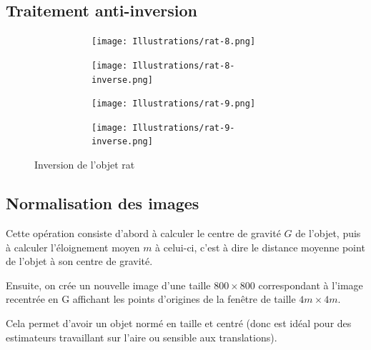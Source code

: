 \documentclass{article}
\theoremstyle{definition}
\begin{document}
    \subsection{Traitement anti-inversion}
    \label{sec:anti-inversion}
    
      \begin{figure}[!h]
	\centering
	\begin{subfigure}{.49\textwidth}
	  \begin{subfigure}{.49\textwidth}
	    \centering
	    \texttt{[image: Illustrations/rat-8.png]}
	    \label{1strat}
	  \end{subfigure}
	  \begin{subfigure}{.49\textwidth}
	    \centering
	    \texttt{[image: Illustrations/rat-8-inverse.png]}
	    \label{1strat-inverse}
	  \end{subfigure}
	\end{subfigure}
	\begin{subfigure}{.49\textwidth}
	  \begin{subfigure}{.49\textwidth}
	    \centering
	    \texttt{[image: Illustrations/rat-9.png]}
	  \label{2ndrat}
	  \end{subfigure}
	  \begin{subfigure}{.49\textwidth}
	    \centering
	    \texttt{[image: Illustrations/rat-9-inverse.png]}
	  \label{2ndrat-inverse}
	  \end{subfigure}
	\end{subfigure}
	\caption{Inversion de l'objet rat}
	\label{anti-inversion}
      \end{figure}

    \subsection{Normalisation des images}  
    
    Cette opération consiste d'abord à calculer le centre de gravité $G$ de l'objet, puis à calculer l'éloignement moyen $m$ à celui-ci, c'est à dire le distance moyenne point de l'objet à son centre de gravité.
    
    Ensuite, on crée un nouvelle image d'une taille $800 \times 800$ correspondant à l'image recentrée en G affichant les points d'origines de la fenêtre de taille $4m \times 4m$.
    
    Cela permet d'avoir un objet normé en taille et centré (donc est idéal pour des estimateurs travaillant sur l'aire ou sensible aux translations).
      
\end{document}
